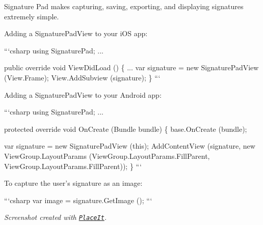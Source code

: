 Signature Pad makes capturing, saving, exporting, and displaying signatures extremely simple.

Adding a {\ttfamily Signature\+Pad\+View} to your i\+O\+S app\+:

```csharp using Signature\+Pad; ...

public override void View\+Did\+Load () \{ ... var signature = new Signature\+Pad\+View (View.\+Frame); View.\+Add\+Subview (signature); \} ```

Adding a {\ttfamily Signature\+Pad\+View} to your Android app\+:

```csharp using Signature\+Pad; ...

protected override void On\+Create (Bundle bundle) \{ base.\+On\+Create (bundle);

var signature = new Signature\+Pad\+View (this); Add\+Content\+View (signature, new View\+Group.\+Layout\+Params (View\+Group.\+Layout\+Params.\+Fill\+Parent, View\+Group.\+Layout\+Params.\+Fill\+Parent)); \} ```

To capture the user's signature as an image\+:

```csharp var image = signature.\+Get\+Image (); ```

{\itshape Screenshot created with \href{http://placeit.breezi.com}{\tt Place\+It}.} 